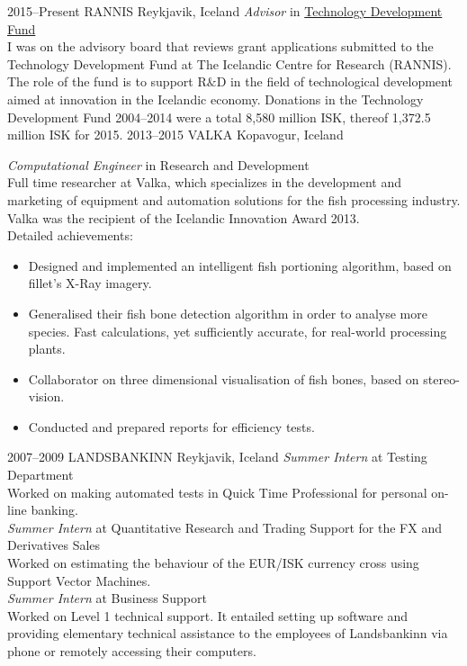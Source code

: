 \documentclass[]{cv} %
\begin{document}
\begin{entrylist}
\entry
{2015--Present}
{RANNIS}
{Reykjavik, Iceland}
{\emph{Advisor} in 
\href{http://www.rannis.is/sjodir/rannsoknir/taeknithrounarsjodur/fagrad/}{Technology
 Development Fund}\\
I was on the advisory board that reviews grant applications submitted to 
the  Technology Development Fund at The Icelandic Centre for Research (RANNIS).
The role of the fund is to support R$\&$D in the field of technological 
development aimed at innovation in the Icelandic economy.
Donations in the Technology Development Fund 2004--2014 were a total 8,580 
million ISK, thereof 1,372.5 million ISK for 2015.
}
\entry
{2013--2015}
{VALKA}
{Kopavogur, Iceland}
{\emph{Computational Engineer} in Research and Development \\
Full time researcher at Valka, which specializes in the development and marketing of equipment and automation solutions for the fish processing industry. Valka was the recipient of the Icelandic Innovation Award 2013. \\
Detailed achievements:
\begin{itemize}
\item Designed and implemented an intelligent fish portioning algorithm, based 
on fillet's X-Ray imagery. 
\item Generalised their fish bone detection algorithm in order to analyse more species. Fast calculations, yet sufficiently accurate, for real-world processing plants.
\item Collaborator on three dimensional visualisation of fish bones, based on stereo-vision.
\item Conducted and prepared reports for efficiency tests.
\end{itemize}
}
\entry
{2007--2009}
{LANDSBANKINN}
{Reykjavik, Iceland}
{
\emph{Summer Intern} at Testing Department \\ Worked on making automated tests 
in Quick Time Professional for personal on-line banking. 
\\
\emph{Summer Intern} at Quantitative Research and Trading Support for the FX and Derivatives Sales \\ Worked on estimating the behaviour of the EUR/ISK currency cross using Support Vector Machines.
\\
\emph{Summer Intern} at Business Support \\ Worked on Level 1 technical support. It entailed setting up software and providing elementary technical assistance to the employees of Landsbankinn via phone or remotely accessing their computers.
}
\end{entrylist}
\end{document}
